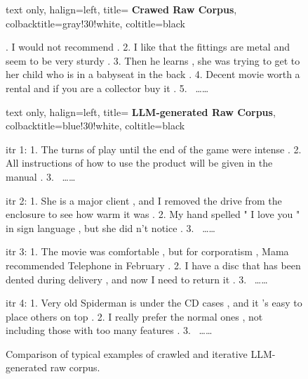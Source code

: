 
\begin{figure}[h]
    \vspace{0.5mm}
    \footnotesize
    \begin{tcblisting}{text only, 
        halign=left, 
        title= \textbf{Crawed Raw Corpus}, 
        colbacktitle=gray!30!white, 
        coltitle=black
    }
    
    \textsf{\fontsize{8}{8}. I would not recommend .
    2. I like that the fittings are metal and seem to be very sturdy . 
    3. Then he learns , she was trying to get to her child who is in a babyseat in the back . 
    4. Decent movie worth a rental and if you are a collector buy it .
    5. ~\dots\dots
    }

    \end{tcblisting}







    \begin{tcblisting}{text only, 
        halign=left, 
        title= \textbf{LLM-generated Raw Corpus}, 
        colbacktitle=blue!30!white, 
        coltitle=black
    }

    \textsf{\fontsize{8}{0}\selectfont
    {\color{blue} itr 1:}
    1. The turns of play until the end of the game were intense .
    2. All instructions of how to use the product will be given in the manual .
    3. ~\dots\dots
    }

    \vspace{-6pt} \hdashrule{\linewidth}{0.4pt}{.5mm} \vspace{-12pt}

    \textsf{\fontsize{8}{0}\selectfont
    {\color{blue} itr 2:}
    1. She is a major client , and I removed the drive from the enclosure to see how warm it was .
    2. My hand spelled " I love you " in sign language , but she did n't notice .
    3. ~\dots\dots
    }

    \vspace{-6pt} \hdashrule{\linewidth}{0.4pt}{.5mm} \vspace{-12pt}

    \textsf{\fontsize{8}{0}\selectfont
    {\color{blue} itr 3:}
    1. The movie was comfortable , but for corporatism , Mama recommended Telephone in February .
    2. I have a disc that has been dented during delivery , and now I need to return it .
    3. ~\dots\dots
    }

    \vspace{-6pt} \hdashrule{\linewidth}{0.4pt}{.5mm} \vspace{-12pt}

    \textsf{\fontsize{8}{0}\selectfont
    {\color{blue} itr 4:}
    1. Very old Spiderman is under the CD cases , and it 's easy to place others on top .
    2. I really prefer the normal ones , not including those with too many features .
    3. ~\dots\dots
    }
    
    \end{tcblisting}

    \caption{Comparison of typical examples of crawled and iterative LLM-generated raw corpus.}
    \label{fig:crawled_vs_LLMgen}
\end{figure}